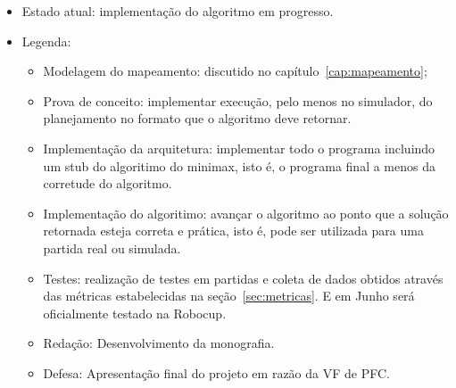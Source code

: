 \begin{itemize}
  \item Estado atual: implementação do algoritmo em progresso.
  \item Legenda:
    \begin{itemize}
      \item Modelagem do mapeamento: discutido no capítulo~\ref{cap:mapeamento};
      \item Prova de conceito: implementar execução, pelo menos no simulador, do
        planejamento no formato que o algoritmo deve retornar.
      \item Implementação da arquitetura: implementar todo o programa incluindo
        um stub do algoritimo do minimax, isto é, o programa final a menos da
        corretude do algoritmo.
      \item Implementação do algoritimo: avançar o algoritmo ao ponto que a
        solução retornada esteja correta e prática, isto é, pode ser utilizada
        para uma partida real ou simulada.
      \item Testes: realização de testes em partidas e coleta de dados obtidos
        através das métricas estabelecidas na seção~\ref{sec:metricas}. E em
        Junho será oficialmente testado na Robocup.
      \item Redação: Desenvolvimento da monografia.
      \item Defesa: Apresentação final do projeto em razão da VF de PFC.
    \end{itemize}
\end{itemize}

